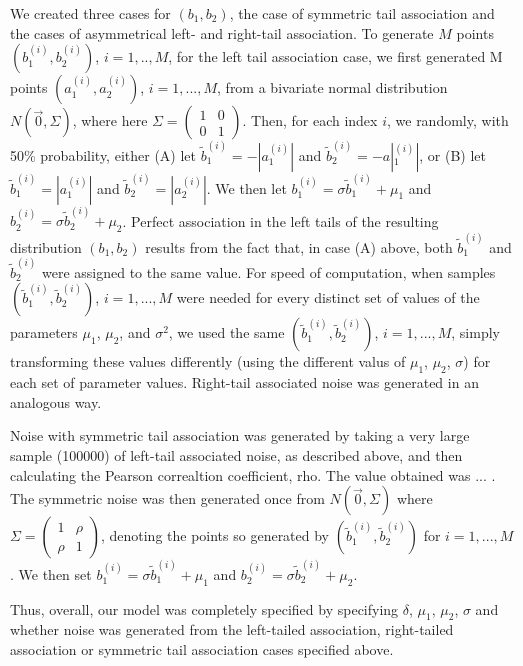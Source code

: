 \documentclass[letterpaper,11pt]{article}
\begin{document}
We created three cases for $(b_1,b_2)$, the case of symmetric tail association and the cases of asymmetrical left- and right-tail association. 
To generate $M$ points $\left(b_1^{(i)}, b_2^{(i)}\right)$, $i=1,..,M$, for the left tail association case, we first generated M points $(a_1^{(i)},a_2^{(i)})$, $i=1,...,M$, from a bivariate normal distribution $N\left( \vec{0}, \Sigma \right)$, where here $\Sigma = \begin{pmatrix} 1&0\\0&1\end{pmatrix}$. 
Then, for each index $i$, we randomly, with 50\% probability, either (A) let $\tilde b_1^{(i)} = -|a_1^{(i)}|$ and $\tilde b_2^{(i)} = -a|_1^{(i)}|$, or (B) let $\tilde b_1^{(i)} = |a_1^{(i)}|$ and $\tilde b_2^{(i)} = |a_2^{(i)}|$. 
We then let $b_1^{(i)} = \sigma \tilde b_1^{(i)} + \mu_1$ and $b_2^{(i)} = \sigma \tilde b_2^{(i)} + \mu_2$. 
Perfect association in the left tails of the resulting distribution $\left(b_1,b_2\right)$ results from the fact that, in case (A) above, both $\tilde b_1^{(i)}$ and $\tilde b_2^{(i)}$ were assigned to the same value. 
For speed of computation, when samples $(\tilde b_1^{(i)},\tilde b_2^{(i)})$, $i=1,...,M$ were needed for every distinct set of values of the parameters $\mu_1$, $\mu_2$, and $\sigma^2$, we used the same $\left(\tilde b_1^{(i)},\tilde b_2^{(i)}\right)$, $i=1,...,M$, simply transforming these values differently (using the different valus of $\mu_1$, $\mu_2$, $\sigma$) for each set of parameter values. Right-tail associated noise was generated in an analogous way. 

Noise with symmetric tail association was generated by taking a very large sample (100000) of left-tail associated noise, as described above, and then calculating the Pearson correaltion coefficient, rho.
The value obtained was ... . 
The symmetric noise was then generated once from $N\left(\vec{0}, \Sigma \right)$ where $\Sigma = \begin{pmatrix} 1&\rho \\ \rho&1\end{pmatrix}$, denoting the points so generated by $\left(\tilde b_1^{(i)},\tilde b_2^{(i)}\right)$ for $i=1,...,M$. 
We then set $b_1^{(i)} = \sigma \tilde b_1^{(i)} + \mu_1$ and $b_2^{(i)} = \sigma \tilde b_2^{(i)}+ \mu_2$.

Thus, overall, our model was completely specified by specifying $\delta$, $\mu_1$, $\mu_2$, $\sigma$ and whether noise was generated from the left-tailed association, right-tailed association or symmetric tail association cases specified above. 
\end{document}
